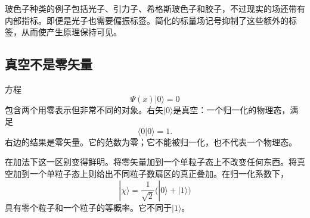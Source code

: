 \begin{classroomqa}
\end{classroomqa}

玻色子种类的例子包括光子、引力子、希格斯玻色子和胶子，不过现实的场还带有内部指标。即便是光子也需要偏振标签。简化的标量场记号抑制了这些额外的标签，从而使产生原理保持可见。

\subsection{真空不是零矢量}

方程
\begin{equation}
\Psi(x)|0\rangle=0
\end{equation}
包含两个用零表示但非常不同的对象。右矢\(|0\rangle\)是真空：一个归一化的物理态，满足
\begin{equation}
\langle0|0\rangle=1.
\end{equation}
右边的结果是零矢量。它的范数为零；它不能被归一化，也不代表一个物理态。

在加法下这一区别变得鲜明。将零矢量加到一个单粒子态上不改变任何东西。将真空加到一个单粒子态上则给出不同粒子数扇区的真正叠加。在归一化系数下，
\begin{equation}
|\chi\rangle=\frac{1}{\sqrt2}\bigl(|0\rangle+|1\rangle\bigr)
\end{equation}
具有零个粒子和一个粒子的等概率。它不同于\(|1\rangle\)。

\begin{classroomqa}
\end{classroomqa}

\begin{classroomqa}
\end{classroomqa}

